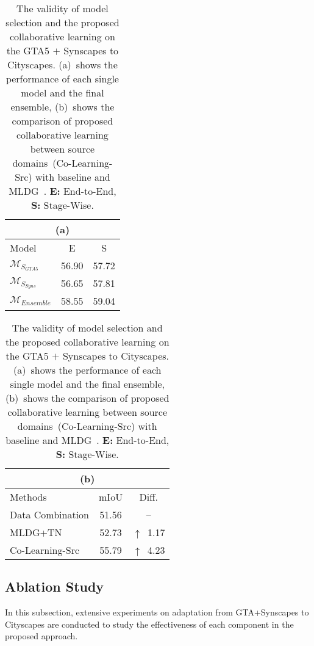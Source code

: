 \documentclass[final]{cvpr}
\def\M{\mathcal{M}}
\begin{document}
\begin{table}
	\centering
	\caption{The validity of model selection and the proposed collaborative learning on the GTA5 $+$ Synscapes to Cityscapes. (a)~shows the performance of each single model and the final ensemble, (b)~shows the comparison of proposed collaborative learning between source domains~(Co-Learning-Src) with baseline and MLDG~\cite{zhang2020generalizable}. \textbf{E:} End-to-End, \textbf{S:} Stage-Wise.}
	\label{tab:col}
	\vspace{1mm}
\small
	\setlength{\tabcolsep}{0.78mm}
	\begin{tabular}{l|cc}
		\multicolumn{3}{c}{(a)}\\
		\hline
		\hline
		Model & E & S \\
		\hline
		$\M_{S_{GTA5}}$ & 56.90 & 57.72 \\
		$\M_{S_{Syns}}$ & 56.65 & 57.81 \\
		\hline
		$\M_{Ensemble}$ & 58.55 & 59.04 \\
		\hline
	\end{tabular}
\hspace{2mm}
	\begin{tabular}{l|c|c}
		\multicolumn{3}{c}{(b)}\\
		\hline
\hline
		Methods  & mIoU & Diff. \\
		\hline
		Data Combination   & 51.56 & -- \\
		MLDG+TN~\cite{zhang2020generalizable}  & 52.73 & $\uparrow$~1.17\\
		\hline
Co-Learning-Src & 55.79 & $\uparrow$~4.23\\
\hline
	\end{tabular}
\vspace{-10pt}
\end{table}




\subsection{Ablation Study}
In this subsection, extensive experiments on adaptation from GTA+Synscapes to Cityscapes are conducted to study the effectiveness of each component in the proposed approach. 
\end{document}
